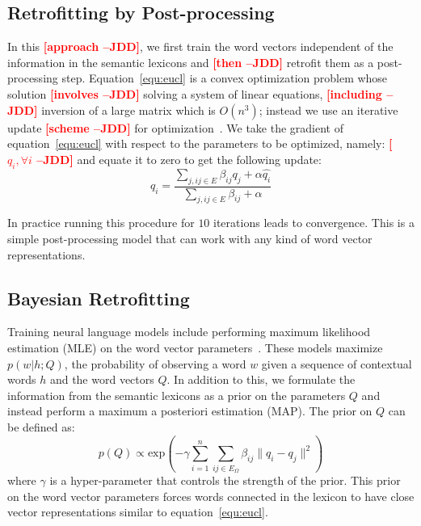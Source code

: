 \documentclass[11pt]{article}
\newcommand{\jdd}[1]{\textcolor{red}{\bf\small [#1 --JDD]}}
\begin{document}
\subsection{Retrofitting by Post-processing}
\label{sec:post-proc}

In this \jdd{approach}, we first train the word vectors independent of the information in the semantic lexicons
and  \jdd{then} retrofit them as a post-processing step. Equation~\ref{equ:eucl} is a convex 
optimization problem whose solution  \jdd{involves} solving a system of linear equations,  \jdd{including} inversion of a 
large matrix which is $O(n^3)$;  instead we use an iterative update \jdd{scheme}  for 
optimization~\cite{Bengio+al-ssl-2006,Subramanya:2010:EGS:1870658.1870675,das-petrov:2011:ACL-HLT2011,das-smith:2011:ACL-HLT2011}.
We take the gradient of equation~\ref{equ:eucl} with respect to the parameters to be optimized, namely: \jdd{$q_i,\forall i$} and equate it to zero to get the following update:
\begin{equation}
  \label{equ:update-vector}
q_i = \frac{\sum_{j, ij \in E} \beta_{ij} q_j + \alpha \hat{q_i}}{\sum_{j, ij \in E} \beta_{ij} + \alpha}
\end{equation}

In practice running this procedure for $10$ iterations leads to convergence. This is a simple 
post-processing model that can work with any kind of word vector representations.

\subsection{Bayesian Retrofitting}
\label{sec:during-training}

Training neural language models include performing maximum likelihood estimation (MLE) on the 
word vector parameters~\cite{Collobert:2008:UAN:1390156.1390177,MnihTeh2012,mikolov2013efficient}. 
These models maximize $p(w|h;Q)$, the probability of observing a word $w$ given a sequence of contextual words
$h$ and the word vectors $Q$. In addition to this, we formulate the information from the semantic lexicons
as a prior on the parameters $Q$ and instead perform a maximum a posteriori estimation (MAP). The prior
on $Q$ can be defined as:
\begin{equation}
  \label{equ:prior}
  p(Q) \propto \text{exp}\left(-\gamma\sum_{i=1}^{n}\sum_{ij \in E_{\Omega}}\beta_{ij} \lVert q_{i}-q_{j} \rVert^{2}\right)
\end{equation}
where $\gamma$ is a hyper-parameter that controls the strength of the prior. This prior on the word
vector parameters forces words connected in the lexicon to have close vector representations similar to
equation~\ref{equ:eucl}.
\end{document}
